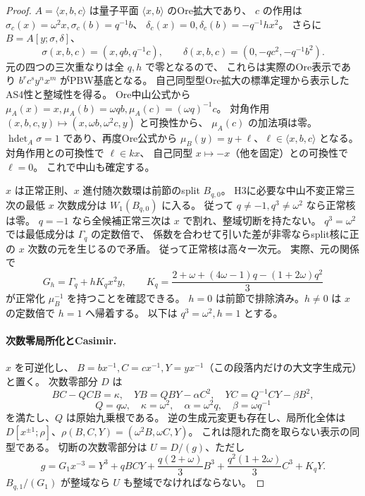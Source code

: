 \begin{proof}
$A=\langle x,b,c\rangle$ は量子平面 $\langle x,b\rangle$ のOre拡大であり、
$c$ の作用は $\sigma_c(x)=\omega^2x,\sigma_c(b)=q^{-1}b$、
$\delta_c(x)=0,\delta_c(b)=-q^{-1}h x^2$。
さらに $B=A[y;\sigma,\delta]$、
\[
 \sigma(x,b,c)=(x,qb,q^{-1}c),\qquad
 \delta(x,b,c)=(0,-qc^2,-q^{-1}b^2).
\]
元の四つの三次重なりは全 $q,h$ で零となるので、
これらは実際のOre表示であり $b^rc^sy^n x^m$ がPBW基底となる。
自己同型型Ore拡大の標準定理から表示したAS4性と整域性を得る。
Ore中山公式から $\mu_A(x)=x,\mu_A(b)=\omega q b,
\mu_A(c)=(\omega q)^{-1}c$。
対角作用 $(x,b,c,y)\mapsto(x,\omega b,\omega^2c,y)$ と可換性から、
$\mu_A(c)$ の加法項は零。
$\operatorname{hdet}_A\sigma=1$ であり、再度Ore公式から
$\mu_B(y)=y+\ell$、$\ell\in\langle x,b,c\rangle$ となる。
対角作用との可換性で $\ell\in kx$、
自己同型 $x\mapsto-x$（他を固定）との可換性で $\ell=0$。
これで中山も確定する。

$x$ は正常正則、$x$ 進付随次数環は前節のsplit $B_{q,0}$。
H3に必要な中山不変正常三次の最低 $x$ 次数成分は $W_1(B_{q,0})$ に入る。
従って $q\ne-1,q^3\ne\omega^2$ なら正常核は零。
$q=-1$ なら全候補正常三次は $x$ で割れ、整域切断を持たない。
$q^3=\omega^2$ では最低成分は $\Gamma_q$ の定数倍で、
係数を合わせて引いた差が非零ならsplit核に正の $x$ 次数の元を生じるので矛盾。
従って正常核は高々一次元。
実際、元の関係で
\[
 G_h=\Gamma_q+h K_q x^2y,\qquad
 K_q=\frac{2+\omega+(4\omega-1)q-(1+2\omega)q^2}{3}
\]
が正常化 $\mu_B^{-1}$ を持つことを確認できる。
$h=0$ は前節で排除済み。$h\ne0$ は $x$ の定数倍で $h=1$ へ帰着する。
以下は $q^3=\omega^2,h=1$ とする。

\paragraph{次数零局所化とCasimir.}
$x$ を可逆化し、
$B=b x^{-1},C=c x^{-1},Y=y x^{-1}$（この段落内だけの大文字生成元）と置く。
次数零部分 $D$ は
\[
 BC-QCB=\kappa,\quad YB=QBY-\alpha C^2,\quad
 YC=Q^{-1}CY-\beta B^2,
\]
\[
 Q=q\omega,\quad \kappa=\omega^2,\quad
 \alpha=\omega^2q,\quad\beta=\omega q^{-1}
\]
を満たし、$Q$ は原始九乗根である。
逆の生成元変更も存在し、局所化全体は
$D[x^{\pm1};\rho]$、$\rho(B,C,Y)=(\omega^2B,\omega C,Y)$。
これは隠れた商を取らない表示の同型である。
切断の次数零部分は $U=D/(g)$、ただし
\[
 g=G_1x^{-3}=Y^3+qBCY+
 \frac{q(2+\omega)}3B^3+\frac{q^2(1+2\omega)}3C^3+K_qY.
\]
$B_{q,1}/(G_1)$ が整域なら $U$ も整域でなければならない。


\end{proof}

